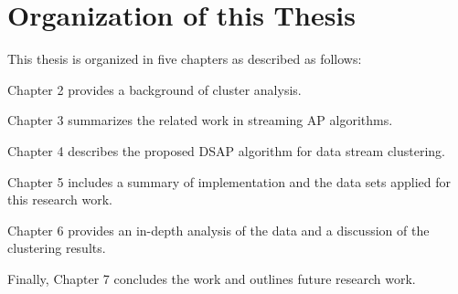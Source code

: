

\section{Organization of this Thesis}
This thesis is organized in five chapters as described as follows:

Chapter 2 provides a background of cluster analysis.

Chapter 3 summarizes the related work in streaming AP algorithms.

Chapter 4 describes the proposed DSAP algorithm for data stream clustering.

Chapter 5 includes a summary of implementation and the data sets applied for this research work.

Chapter 6 provides an in-depth analysis of the data and a discussion of the clustering results.

Finally, Chapter 7 concludes the work and outlines future research work.
% 







